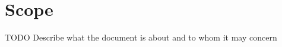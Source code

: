 \chapter{Scope}
\label{secScope}

TODO Describe what the document is about and to whom it may concern
